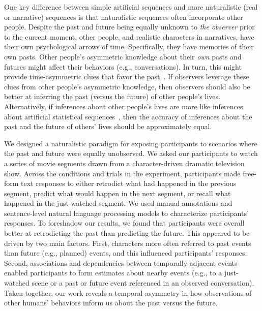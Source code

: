 \documentclass[10pt]{article}
\begin{document}
One key difference between simple artificial sequences and more naturalistic (real or narrative) sequences is that naturalistic sequences often incorporate other people.  Despite the past and future being equally unknown to \textit{the observer} prior to the current moment, other people, and realistic characters in narratives, have their own psychological arrows of time. Specifically, they have memories of their own pasts. Other people's asymmetric knowledge about their \textit{own} pasts and futures might affect their behaviors (e.g., conversations). In turn, this might provide time-asymmetric clues that favor the past~\citep[e.g., other people might talk more about their own pasts than their futures; ][]{DemiEtal18}. If observers leverage these clues from other people's asymmetric knowledge, then observers should also be better at inferring the past (versus the future) of other people's lives.  Alternatively, if inferences about other people's lives are more like inferences about artificial statistical sequences~\citep[e.g., perhaps solely relying on statistical regularities like event schemas, scripts, or situation models][]{RadvCope06, ZwaaRadv98, BoweEtal79, RangRitc12}, then the accuracy of inferences about the past and the future of others' lives should be approximately equal.

We designed a naturalistic paradigm for exposing participants to scenarios where the past and future were equally unobserved.  We asked our participants to watch a series of movie segments drawn from a character-driven dramatic television show.  Across the conditions and trials in the experiment, participants made free-form text responses to either retrodict what had happened in the previous segment, predict what would happen in the next segment, or recall what happened in the just-watched segment.  We used manual annotations and sentence-level natural language processing models to characterize participants' responses.  To foreshadow our results, we found that participants were overall better at retrodicting the past than predicting the future. This appeared to be driven by two main factors.  First, characters more often referred to past events than future (e.g., planned) events, and this influenced participants' responses. Second, associations and dependencies between temporally adjacent events enabled participants to form estimates about nearby events (e.g., to a just-watched scene or a past or future event referenced in an observed conversation).  Taken together, our work reveals a temporal asymmetry in how observations of other humans’ behaviors inform us about the past versus the future.
\end{document}
